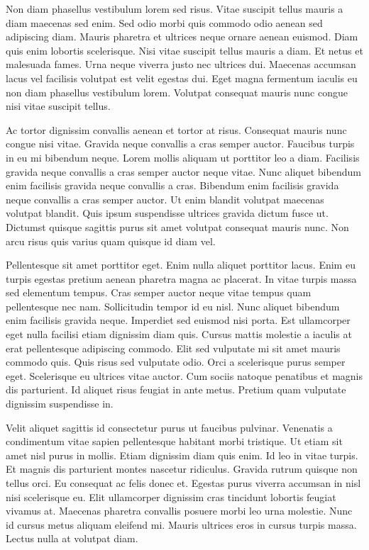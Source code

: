 Non diam phasellus vestibulum lorem sed risus. Vitae suscipit tellus mauris a
diam maecenas sed enim. Sed odio morbi quis commodo odio aenean sed adipiscing
diam. Mauris pharetra et ultrices neque ornare aenean euismod. Diam quis enim
lobortis scelerisque. Nisi vitae suscipit tellus mauris a diam. Et netus et
malesuada fames. Urna neque viverra justo nec ultrices dui. Maecenas accumsan
lacus vel facilisis volutpat est velit egestas dui. Eget magna fermentum
iaculis eu non diam phasellus vestibulum lorem. Volutpat consequat mauris nunc
congue nisi vitae suscipit tellus.

Ac tortor dignissim convallis aenean et tortor at risus. Consequat mauris nunc
congue nisi vitae. Gravida neque convallis a cras semper auctor. Faucibus
turpis in eu mi bibendum neque. Lorem mollis aliquam ut porttitor leo a diam.
Facilisis gravida neque convallis a cras semper auctor neque vitae. Nunc
aliquet bibendum enim facilisis gravida neque convallis a cras. Bibendum enim
facilisis gravida neque convallis a cras semper auctor. Ut enim blandit
volutpat maecenas volutpat blandit. Quis ipsum suspendisse ultrices gravida
dictum fusce ut. Dictumst quisque sagittis purus sit amet volutpat consequat
mauris nunc. Non arcu risus quis varius quam quisque id diam vel.

Pellentesque sit amet porttitor eget. Enim nulla aliquet porttitor lacus. Enim
eu turpis egestas pretium aenean pharetra magna ac placerat. In vitae turpis
massa sed elementum tempus. Cras semper auctor neque vitae tempus quam
pellentesque nec nam. Sollicitudin tempor id eu nisl. Nunc aliquet bibendum
enim facilisis gravida neque. Imperdiet sed euismod nisi porta. Est ullamcorper
eget nulla facilisi etiam dignissim diam quis. Cursus mattis molestie a iaculis
at erat pellentesque adipiscing commodo. Elit sed vulputate mi sit amet mauris
commodo quis. Quis risus sed vulputate odio. Orci a scelerisque purus semper
eget. Scelerisque eu ultrices vitae auctor. Cum sociis natoque penatibus et
magnis dis parturient. Id aliquet risus feugiat in ante metus. Pretium quam
vulputate dignissim suspendisse in.

Velit aliquet sagittis id consectetur purus ut faucibus pulvinar. Venenatis a
condimentum vitae sapien pellentesque habitant morbi tristique. Ut etiam sit
amet nisl purus in mollis. Etiam dignissim diam quis enim. Id leo in vitae
turpis. Et magnis dis parturient montes nascetur ridiculus. Gravida rutrum
quisque non tellus orci. Eu consequat ac felis donec et. Egestas purus viverra
accumsan in nisl nisi scelerisque eu. Elit ullamcorper dignissim cras tincidunt
lobortis feugiat vivamus at. Maecenas pharetra convallis posuere morbi leo urna
molestie. Nunc id cursus metus aliquam eleifend mi. Mauris ultrices eros in
cursus turpis massa. Lectus nulla at volutpat diam.

